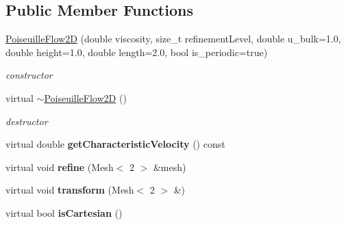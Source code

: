 \subsection*{Public Member Functions}
\begin{DoxyCompactItemize}
\item 
\hyperlink{classnatrium_1_1PoiseuilleFlow2D_a377e6996a9b45552b9a56aa96d0325ee}{PoiseuilleFlow2D} (double viscosity, size\_\-t refinementLevel, double u\_\-bulk=1.0, double height=1.0, double length=2.0, bool is\_\-periodic=true)
\begin{DoxyCompactList}\small\item\em constructor \item\end{DoxyCompactList}\item 
\hypertarget{classnatrium_1_1PoiseuilleFlow2D_a62f9e7cfb2e32753b58eafb9d5936fd4}{
virtual \hyperlink{classnatrium_1_1PoiseuilleFlow2D_a62f9e7cfb2e32753b58eafb9d5936fd4}{$\sim$PoiseuilleFlow2D} ()}
\label{classnatrium_1_1PoiseuilleFlow2D_a62f9e7cfb2e32753b58eafb9d5936fd4}

\begin{DoxyCompactList}\small\item\em destructor \item\end{DoxyCompactList}\item 
\hypertarget{classnatrium_1_1PoiseuilleFlow2D_ae3c247688d49d23a5b0940e22f795309}{
virtual double {\bfseries getCharacteristicVelocity} () const }
\label{classnatrium_1_1PoiseuilleFlow2D_ae3c247688d49d23a5b0940e22f795309}

\item 
\hypertarget{classnatrium_1_1PoiseuilleFlow2D_a4c65eee9fd6a2e13f53dd6332f7707c2}{
virtual void {\bfseries refine} (Mesh$<$ 2 $>$ \&mesh)}
\label{classnatrium_1_1PoiseuilleFlow2D_a4c65eee9fd6a2e13f53dd6332f7707c2}

\item 
\hypertarget{classnatrium_1_1PoiseuilleFlow2D_ac1b836d6a4689d7e0b2fb3a9fb1cfd80}{
virtual void {\bfseries transform} (Mesh$<$ 2 $>$ \&)}
\label{classnatrium_1_1PoiseuilleFlow2D_ac1b836d6a4689d7e0b2fb3a9fb1cfd80}

\item 
\hypertarget{classnatrium_1_1PoiseuilleFlow2D_a64c665d55db4cb8aed4317e09d975a6e}{
virtual bool {\bfseries isCartesian} ()}
\label{classnatrium_1_1PoiseuilleFlow2D_a64c665d55db4cb8aed4317e09d975a6e}

\end{DoxyCompactItemize}


